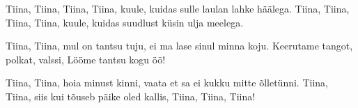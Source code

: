 Tiina, Tiina, Tiina, Tiina,
kuule, kuidas sulle laulan lahke h\"a\"alega.
Tiina, Tiina, Tiina, Tiina,
kuule, kuidas suudlust k\"usin ulja meelega.

Tiina, Tiina, mul on tantsu tuju,
ei ma lase sinul minna koju.
Keerutame tangot, polkat, valssi,
L\"o\"ome tantsu kogu \"o\"o!

Tiina, Tiina, hoia minust kinni,
vaata et sa ei kukku mitte \~ollet\"unni.
Tiina, Tiina, siis kui t\~ouseb p\"aike
oled kallis, Tiina, Tiina, Tiina!